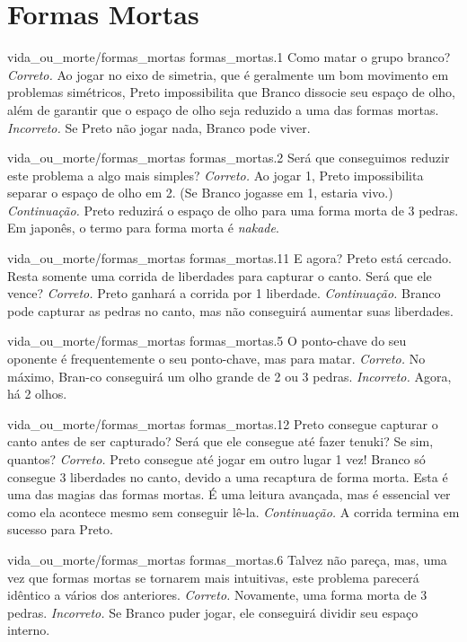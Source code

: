\chapter{Formas Mortas}

\emptypage

\problemAnswerDiagram
  {vida_ou_morte/formas_mortas}
  {formas_mortas.1}
  {Como matar o grupo branco?}
  {\emph{Correto.} Ao jogar no eixo de simetria, que é geralmente um bom movimento em problemas simétricos, Preto impossibilita que Branco dissocie seu espaço de olho, além de garantir que o espaço de olho seja reduzido a uma das formas mortas.}
  {\emph{Incorreto.} Se Preto não jogar nada, Branco pode viver.}

\problemAnswerDiagram
  {vida_ou_morte/formas_mortas}
  {formas_mortas.2}
  {Será que conseguimos reduzir este problema a algo mais simples?}
  {\emph{Correto.} Ao jogar 1, Preto impossibilita separar o espaço de olho em 2. (Se Branco jogasse em 1, estaria vivo.)}
  {\emph{Continuação.} Preto reduzirá o espaço de olho para uma forma morta de 3 pedras. Em japonês, o termo para forma morta é \emph{nakade}.}

\problemAnswerDiagram
  {vida_ou_morte/formas_mortas}
  {formas_mortas.11}
  {E agora? Preto está cercado. Resta somente uma corrida de liberdades para capturar o canto. Será que ele vence?}
  {\emph{Correto.} Preto ganhará a corrida por 1 liberdade.}
  {\emph{Continuação.} Branco pode capturar as pedras no canto, mas não conseguirá aumentar suas liberdades.}

\problemAnswerDiagram
  {vida_ou_morte/formas_mortas}
  {formas_mortas.5}
  {O ponto-chave do seu oponente é frequentemente o seu ponto-chave, mas para matar.}
  {\emph{Correto.} No máximo, Bran-co conseguirá um olho grande de 2 ou 3 pedras.}
  {\emph{Incorreto.} Agora, há 2 olhos.}

\problemAnswerDiagram
  {vida_ou_morte/formas_mortas}
  {formas_mortas.12}
  {Preto consegue capturar o canto antes de ser capturado? Será que ele consegue até fazer tenuki? Se sim, quantos?}
  {\emph{Correto.} Preto consegue até jogar em outro lugar 1 vez! Branco só consegue 3 liberdades no canto, devido a uma recaptura de forma morta. Esta é uma das magias das formas mortas. É uma leitura avançada, mas é essencial ver como ela acontece mesmo sem conseguir lê-la.}
  {\emph{Continuação.} A corrida termina em sucesso para Preto.}

\problemAnswerDiagram
  {vida_ou_morte/formas_mortas}
  {formas_mortas.6}
  {Talvez não pareça, mas, uma vez que formas mortas se tornarem mais intuitivas, este problema parecerá idêntico a vários dos anteriores.}
  {\emph{Correto.} Novamente, uma forma morta de 3 pedras.}
  {\emph{Incorreto.} Se Branco puder jogar, ele conseguirá dividir seu espaço interno.}

